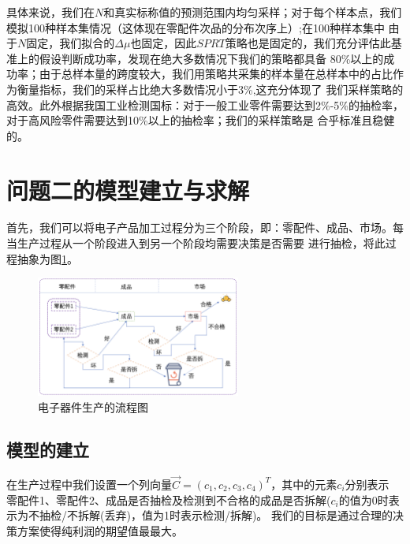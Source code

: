 \documentclass[withoutpreface,bwprint]{cumcmthesis} %
\begin{document}
具体来说，我们在$N$和真实标称值的预测范围内均匀采样；对于每个样本点，我们模拟100种样本集情况（这体现在零配件次品的分布次序上）;在100种样本集中
由于$N$固定，我们拟合的$\Delta \mu$也固定，因此$SPRT$策略也是固定的，我们充分评估此基准上的假设判断成功率，发现在绝大多数情况下我们的策略都具备
80\%以上的成功率；由于总样本量的跨度较大，我们用策略共采集的样本量在总样本中的占比作为衡量指标，我们的采样占比绝大多数情况小于3\%,这充分体现了
我们采样策略的高效。此外根据我国工业检测国标：对于一般工业零件需要达到2\%-5\%的抽检率，对于高风险零件需要达到10\%以上的抽检率；我们的采样策略是
合乎标准且稳健的。
\section{问题二的模型建立与求解}
首先，我们可以将电子产品加工过程分为三个阶段，即：零配件、成品、市场。每当生产过程从一个阶段进入到另一个阶段均需要决策是否需要
进行抽检，将此过程抽象为图\ref{fig:pro2}。
\begin{figure}[H]
	\centering
	\includegraphics[width=0.6\textwidth]{Fig/pro2.png}      %
	\caption{电子器件生产的流程图}
	\label{fig:pro2}
\end{figure}
\subsection{模型的建立}
在生产过程中我们设置一个列向量$\vec{C}=(c_{1},c_{2},c_{3},c_{4})^{T}$，其中的元素$c_i$分别表示
零配件1、零配件2、成品是否抽检及检测到不合格的成品是否拆解($c_{i}$的值为0时表示为不抽检/不拆解(丢弃)，值为1时表示检测/拆解)。
我们的目标是通过合理的决策方案使得纯利润的期望值最最大。
\end{document}
